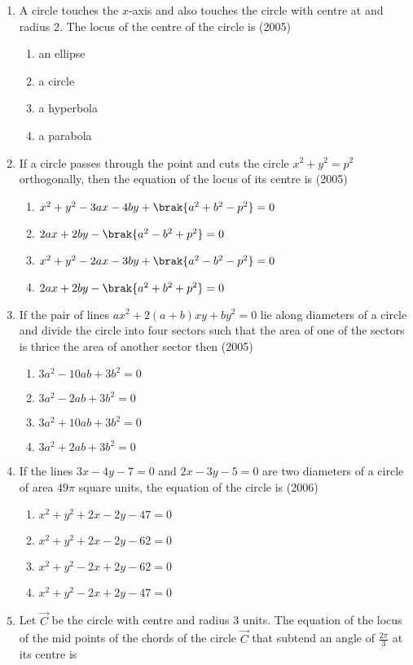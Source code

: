 \begin{enumerate}
\begin{enumerate}
\end{enumerate}
\item A circle touches the $x$-axis and also touches the circle with centre at  and radius 2. The locus of the centre of the circle is
\hfill{(2005)}
\begin{multicols}{2}
\begin{enumerate}
\item an ellipse
\item a circle 
\item a hyperbola
\item a parabola
\end{enumerate}
\end{multicols}
\item If a circle passes through the point  and cuts the circle $x^2+y^2=p^2$ orthogonally, then the equation of the locus of its centre is 
\hfill{(2005)}
\begin{enumerate}
\item $x^2+y^2-3ax-4by+\brak{a^2+b^2-p^2}=0$
\item $2ax+2by-\brak{a^2-b^2+p^2}=0$
\item $x^2+y^2-2ax-3by+\brak{a^2-b^2-p^2}=0$
\item $2ax+2by-\brak{a^2+b^2+p^2}=0$
\end{enumerate}
\item If the pair of lines $ax^2+2(a+b)xy+by^2=0$ lie along diameters of a circle and divide the circle into four sectors such that the area of one of the sectors is thrice the area of another sector then
\hfill{(2005)}
\begin{enumerate}
\item $3a^2-10ab+3b^2=0$
\item $3a^2-2ab+3b^2=0$
\item $3a^2+10ab+3b^2=0$
\item $3a^2+2ab+3b^2=0$
\end{enumerate}
\item If the lines $3x-4y-7=0$ and $2x-3y-5=0$ are two diameters of a circle of area $49\pi$ square units, the equation of the circle is 
\hfill{(2006)}
\begin{enumerate}
\item $x^2+y^2+2x-2y-47=0$
\item $x^2+y^2+2x-2y-62=0$
\item $x^2+y^2-2x+2y-62=0$
\item $x^2+y^2-2x+2y-47=0$
\end{enumerate}
\item Let $\vec{C}$ be the circle with centre  and radius 3 units. The equation of the locus of the mid points of the chords of the circle $\vec{C}$ that subtend an angle of $\frac{2\pi}{3}$ at its centre is

\end{enumerate}
